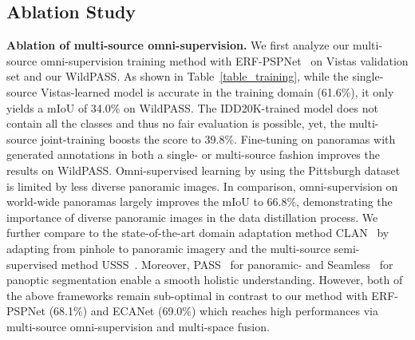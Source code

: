 \documentclass[final]{cvpr}
\newcommand{\BLUE}[1]{\textcolor{azure}{#1}}
\newcommand{\PURPLE}[1]{\textcolor{amethyst}{#1}}
\newcommand{\ORANGE}[1]{\textcolor{orange}{#1}}
\newcommand{\RED}[1]{\textcolor{red}{#1}}
\begin{document}
\subsection{Ablation Study}
\label{sec:ablation}
\noindent
\textbf{Ablation of multi-source omni-supervision.}
We first analyze our multi-source omni-supervision training method with ERF-PSPNet~\cite{yang2020pass} on Vistas validation set and our WildPASS.
As shown in Table~\ref{table_training}, while the single-source Vistas-learned model is accurate in the training domain (61.6\%), it only yields a mIoU of 34.0\% on WildPASS.
The IDD20K-trained model does not contain all the classes and thus no fair evaluation is possible, yet, the multi-source joint-training boosts the score to 39.8\%.
Fine-tuning on panoramas with generated annotations in both a single- or multi-source fashion improves the results on WildPASS. Omni-supervised learning by using the Pittsburgh dataset~\cite{yang2020omnisupervised} is limited by less diverse panoramic images.
In comparison, omni-supervision on world-wide panoramas largely improves the mIoU to 66.8\%, demonstrating the importance of diverse panoramic images in the data distillation process.
We further compare to the state-of-the-art domain adaptation method CLAN~\cite{luo2019taking} by adapting from pinhole to panoramic imagery and the multi-source semi-supervised method USSS~\cite{kalluri2019universal}. Moreover, PASS~\cite{yang2020pass} for panoramic- and Seamless~\cite{porzi2019seamless} for panoptic segmentation enable a smooth holistic understanding.
However, both of the above frameworks remain sub-optimal in contrast to our method with ERF-PSPNet (68.1\%) and ECANet (69.0\%) which reaches high performances via multi-source omni-supervision and multi-space fusion.

\end{document}
